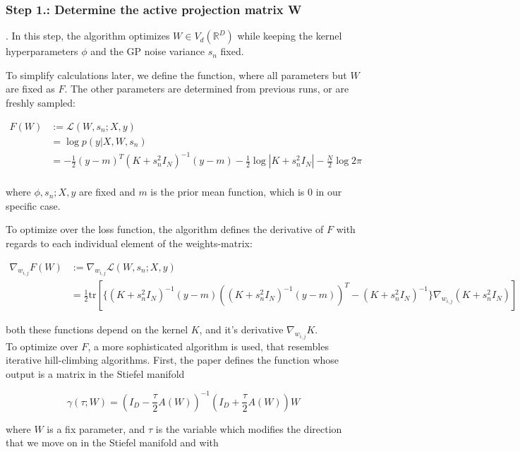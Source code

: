 \subsubsection{Step 1.: Determine the active projection matrix W}.
In this step, the algorithm optimizes $W \in V_d(\mathbb{R}^D)$ while keeping the kernel hyperparameters $\phi$ and the GP noise variance $s_n$ fixed.

To simplify calculations later, we define the function, where all parameters but $W$ are fixed as $F$. 
The other parameters are determined from previous runs, or are freshly sampled:

\begin{align}
F(W) &:= \mathcal{L}(W, s_n; X, y) \\
& = \log p(y | X, W, s_n) \\
& =  -\frac{1}{2} (y - m)^T (K + s_n^2 I_N)^{-1} (y - m) -\frac{1}{2} \log|K + s_n^2 I_N| -\frac{N}{2} \log 2 \pi   \\
\end{align}

where $\phi, s_n; X, y$ are fixed and $m$ is the prior mean function, which is 0 in our specific case.

To optimize over the loss function, the algorithm defines the derivative of $F$ with regards to each individual element of the weights-matrix:

\begin{align}
\nabla_{w_{i,j}} F(W) &:= \nabla_{w_{i,j}} \mathcal{L}(W, s_n; X, y) \\
& = \frac{1}{2} \text{tr} \left[ \{ (K + s_n^2 I_N)^{-1} (y-m) \left( (K + s_n^2 I_N)^{-1} (y-m) \right)^T - (K + s_n^2 I_N)^{-1} \} \nabla_{w_{i,j}} (K + s_n^2 I_N) \right]
\end{align}

both these functions depend on the kernel $K$, and it's derivative $\nabla_{w_{i,j}} K$. \\

To optimize over $F$, a more sophisticated algorithm is used, that resembles iterative hill-climbing algorithms.
First, the paper defines the function whose output is a matrix in the Stiefel manifold

\begin{equation}
\gamma(\tau; W) = (I_D - \frac{\tau}{2} A(W) )^{-1} (I_D + \frac{\tau}{2} A(W) ) W
\end{equation}


where $W$ is a fix parameter, and $\tau$ is the variable which modifies the direction that we move on in the Stiefel manifold and with

